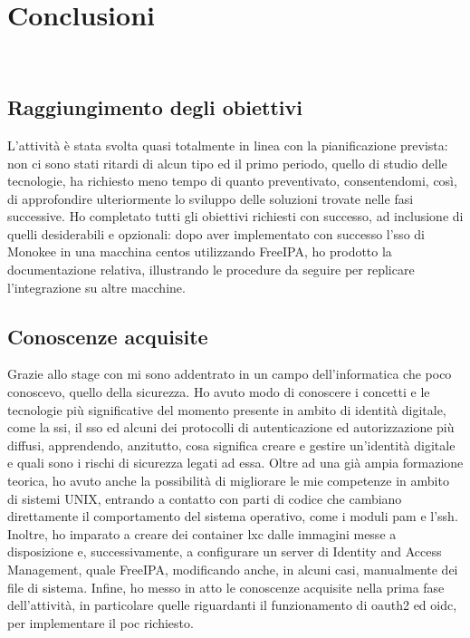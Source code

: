 
\chapter{Conclusioni}
\label{cap:conclusioni}

\\



\section{Raggiungimento degli obiettivi}

L'attività è stata svolta quasi totalmente in linea con la pianificazione prevista: non ci sono stati ritardi di alcun tipo ed il primo periodo, quello di studio delle tecnologie, ha richiesto meno tempo di quanto preventivato, consentendomi, così, di approfondire ulteriormente lo sviluppo delle soluzioni trovate nelle fasi successive.
Ho completato tutti gli obiettivi richiesti con successo, ad inclusione di quelli desiderabili e opzionali: dopo aver implementato con successo l'\acrshort{sso} di Monokee in una macchina \acrshort{centos} utilizzando FreeIPA, ho prodotto la documentazione relativa, illustrando le procedure da seguire per replicare l'integrazione su altre macchine.

\section{Conoscenze acquisite}

Grazie allo stage con \myAzienda{} mi sono addentrato in un campo dell'informatica che poco conoscevo, quello della sicurezza. Ho avuto modo di conoscere i concetti e le tecnologie più significative del momento presente in ambito di identità digitale, come la \acrshort{ssi}, il \acrshort{sso} ed alcuni dei protocolli di autenticazione ed autorizzazione più diffusi, apprendendo, anzitutto, cosa significa creare e gestire un'identità digitale e quali sono i rischi di sicurezza legati ad essa. Oltre ad una già ampia formazione teorica, ho avuto anche la possibilità di migliorare le mie competenze in ambito di sistemi UNIX, entrando a contatto con parti di codice che cambiano direttamente il comportamento del sistema operativo, come i moduli \acrshort{pam} e l'\acrshort{ssh}.
Inoltre, ho imparato a creare dei container \acrshort{lxc} dalle immagini messe a disposizione e, successivamente, a configurare un server di Identity and Access Management, quale FreeIPA, modificando anche, in alcuni casi, manualmente dei file di sistema.
Infine, ho messo in atto le conoscenze acquisite nella prima fase dell'attività, in particolare quelle riguardanti il funzionamento di \acrshort{oauth2} ed \acrshort{oidc}, per implementare il \acrfull{poc} richiesto. 

